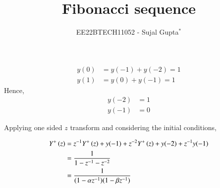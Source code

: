 \documentclass[journal,12pt,twocolumn]{IEEEtran}
\theoremstyle{remark}
\begin{document}
	
	
	\vspace{3cm}
	
	\title{Fibonacci sequence}
	\author{EE22BTECH11052 - Sujal Gupta$^{*}$%
	}
	\maketitle
	\bigskip
	
	\renewcommand{\thefigure}{\theenumi}
	\renewcommand{\thetable}{\theenumi}
	
	
	\vspace{0.2cm}
	\linespread{1.1}
	
	
	\begin{table}[htbp]
	\centering
	\noindent
	\fontsize{10}{15}
	
	\caption*{Input Table}
	
\end{table}
		
	\begin{align}
	y(0)&=y(-1)+y(-2)=1\\
	y(1)&=y(0)+y(-1)=1
	\end{align}
	Hence,
	\begin{align}
	y(-2)&=1\\
	y(-1)&=0
	\end{align}
	
	
	Applying one sided $z$ transform and considering the initial conditions,
	
	\begin{align}
		Y^{+}\left(z\right)	&= z^{-1} Y^{+}\left(z\right) + y(-1) + z^{-2}Y^{+}\left(z\right) + y(-2) + z^{-1}y(-1) \\
		 		&= \dfrac{1}{1 - z^{-1} - z^{-2}}  \\
		 		&= \dfrac{1}{(1 - \alpha z^{-1})(1 - \beta z^{-1})}				
	\end{align}
\end{document}
